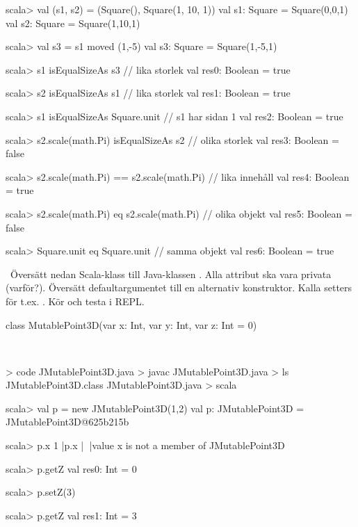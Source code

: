 \SubtaskSolved
\begin{REPL}
scala> val (s1, s2) = (Square(), Square(1, 10, 1))
val s1: Square = Square(0,0,1)
val s2: Square = Square(1,10,1)

scala> val s3 = s1 moved (1,-5)
val s3: Square = Square(1,-5,1)

scala> s1 isEqualSizeAs s3       // lika storlek
val res0: Boolean = true

scala> s2 isEqualSizeAs s1       // lika storlek
val res1: Boolean = true

scala> s1 isEqualSizeAs Square.unit   // s1 har sidan 1
val res2: Boolean = true

scala> s2.scale(math.Pi) isEqualSizeAs s2  // olika storlek
val res3: Boolean = false

scala> s2.scale(math.Pi) == s2.scale(math.Pi) // lika innehåll
val res4: Boolean = true

scala> s2.scale(math.Pi) eq s2.scale(math.Pi)  // olika objekt
val res5: Boolean = false

scala> Square.unit eq Square.unit   // samma objekt
val res6: Boolean = true
\end{REPL}

\QUESTEND




\QUESTBEGIN

\Task \what~Översätt nedan Scala-klass till Java-klassen . Alla attribut ska vara privata (varför?). Översätt defaultargumentet till en alternativ konstruktor. Kalla setters för t.ex. . Kör  och testa i REPL.

\begin{Code}
class MutablePoint3D(var x: Int, var y: Int, var z: Int = 0)
\end{Code}

\SOLUTION

\TaskSolved \what~


\begin{REPL}
> code JMutablePoint3D.java
> javac JMutablePoint3D.java
> ls
JMutablePoint3D.class  JMutablePoint3D.java
> scala

scala> val p = new JMutablePoint3D(1,2)
val p: JMutablePoint3D = JMutablePoint3D@625b215b

scala> p.x
1 |p.x
  |^^^
  |value x is not a member of JMutablePoint3D

scala> p.getZ
val res0: Int = 0

scala> p.setZ(3)

scala> p.getZ
val res1: Int = 3
\end{REPL}

